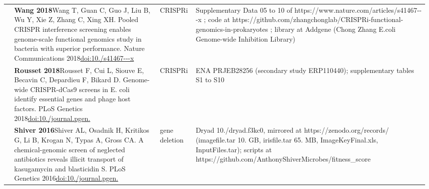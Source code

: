 \begin{landscape}
\begin{longtable}{@{}r@{\hspace{4pt}} L{86mm} L{74mm} L{78mm}@{}}
 & \textbf{Wang 2018}\newline Wang T, Guan C, Guo J, Liu B, Wu Y, Xie Z, Zhang C, Xing XH. Pooled CRISPR interference screening enables genome-scale functional genomics study in bacteria with superior performance. Nature Communications 2018\newline \href{https://doi.org/10.1038/s41467-018-04899-x}{doi:10./\allowbreak s41467---\allowbreak x} & CRISPRi & Supplementary Data 05 to 10 of https:/\allowbreak /\allowbreak www.\allowbreak nature.\allowbreak com/\allowbreak articles/\allowbreak s41467---\allowbreak x ; code at https:/\allowbreak /\allowbreak github.\allowbreak com/\allowbreak zhangchonglab/\allowbreak CRISPRi-\allowbreak functional-\allowbreak genomics-\allowbreak in-\allowbreak prokaryotes ; library at Addgene (Chong Zhang E.\allowbreak  coli Genome-\allowbreak wide Inhibition Library) \\
 & \textbf{Rousset 2018}\newline Rousset F, Cui L, Siouve E, Becavin C, Depardieu F, Bikard D. Genome-wide CRISPR-dCas9 screens in E. coli identify essential genes and phage host factors. PLoS Genetics 2018\newline \href{https://doi.org/10.1371/journal.pgen.1007749}{doi:10./\allowbreak journal.\allowbreak pgen.} & CRISPRi & ENA PRJEB28256 (secondary study ERP110440); supplementary tables S1 to S10 \\
 & \textbf{Shiver 2016}\newline Shiver AL, Osadnik H, Kritikos G, Li B, Krogan N, Typas A, Gross CA. A chemical-genomic screen of neglected antibiotics reveals illicit transport of kasugamycin and blasticidin S. PLoS Genetics 2016\newline \href{https://doi.org/10.1371/journal.pgen.1006124}{doi:10./\allowbreak journal.\allowbreak pgen.} & gene deletion & Dryad 10./\allowbreak dryad.\allowbreak f3kc0, mirrored at https:/\allowbreak /\allowbreak zenodo.\allowbreak org/\allowbreak records/ (imagefile.\allowbreak tar 10. GB, irisfile.\allowbreak tar 65. MB, ImageKeyFinal.\allowbreak xls, InputFiles.\allowbreak tar); scripts at https:/\allowbreak /\allowbreak github.\allowbreak com/\allowbreak AnthonyShiverMicrobes/\allowbreak fitness\_\allowbreak score \\

\end{longtable}
\end{landscape}
